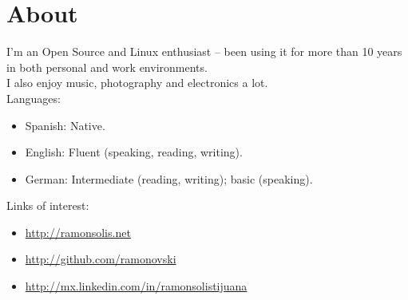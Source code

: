 \documentclass[letterpaper, 11pt]{article}
\begin{document}
	\section*{\huge{About}}
	\noindent\makebox[\linewidth]{\rule{\textwidth}{0.5pt}} 
	I'm an Open Source and Linux enthusiast -- been using it for more than 10 years in both personal and work environments.\\[5mm]
	I also enjoy music, photography and electronics a lot.\\[5mm]
	Languages:
	\begin{itemize} \itemsep1pt \parskip0pt 
		\item Spanish: Native.
		\item English: Fluent (speaking, reading, writing).
		\item German: Intermediate (reading, writing); basic (speaking).
	\end{itemize}
	Links of interest:
	\begin{itemize} \itemsep1pt \parskip0pt 
		\item\href{http://www.ramonsolis.net}{http://ramonsolis.net}
		\item\href{http://github.com/ramonovski}{http://github.com/ramonovski}
		\item\href{http://mx.linkedin.com/in/ramonsolistijuana}{http://mx.linkedin.com/in/ramonsolistijuana}
	\end{itemize}
\end{document}
